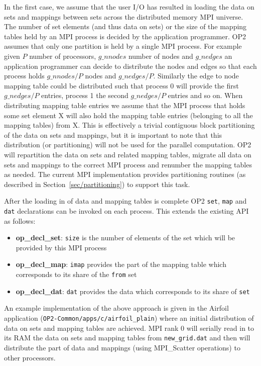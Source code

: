 \documentclass[11pt]{article}
\begin{document}
In the first case, we assume that the user I/O has resulted in loading the data
on sets and mappings between sets across the distributed memory MPI universe.
The number of set elements (and thus data on sets) or the size of the mapping
tables held by an MPI process is decided by the application programmer. OP2
assumes that only one partition is held by a single MPI process. For example
given $P$ number of processors, $g\_nnodes$ number of nodes and $g\_nedges$
an application programmer can decide to distribute the nodes and edges so that
each process holds $g\_nnodes/P$ nodes and $g\_nedges/P$. Similarly the edge to
node mapping table could be distributed such that process 0 will provide the
first $g\_nedges/P$ entries, process 1 the second $g\_nedges/P$ entries and so
on. When distributing mapping table entries we assume that the MPI process that
holds some set element X will also hold the mapping table entries (belonging
to all the mapping tables) from X. This is effectively a trivial contiguous
block partitioning of the data on sets and mappings, but it is important to note
that this distribution (or partitioning) will not be used for the parallel
computation. OP2 will repartition the data on sets and related mapping tables,
migrate all data on sets and mappings to the correct MPI process and renumber
the mapping tables as needed. The current MPI implementation provides
partitioning routines (as described in Section~\ref{sec/partitioning}) to
support this task.

\noindent After the loading in of data and mapping tables is complete OP2
\texttt{set}, \texttt{map} and \texttt{dat} declarations can be invoked on each
process. This extends the existing API as follows:
\begin{itemize}
\item {\bf op\_decl\_set}: {\tt size} is the number of elements of the set which
will be provided by this MPI process

\item {\bf op\_decl\_map}: {\tt imap} provides the part of the mapping table
which corresponds to its share of the {\tt from} set

\item {\bf op\_decl\_dat}: {\tt dat} provides the data which corresponds to its
share of {\tt set}
\end{itemize}
\noindent An example implementation of the above approach is given in the
Airfoil application (\texttt{OP2-Common/apps/c/airfoil\_plain}) where an initial
distribution of data on sets and mapping tables are achieved. MPI rank 0 will
serially read in to its RAM the data on sets and mapping tables from
\texttt{new\_grid.dat} and then will distribute the part of data and mappings
(using MPI\_Scatter operations) to other processors.
\end{document}
